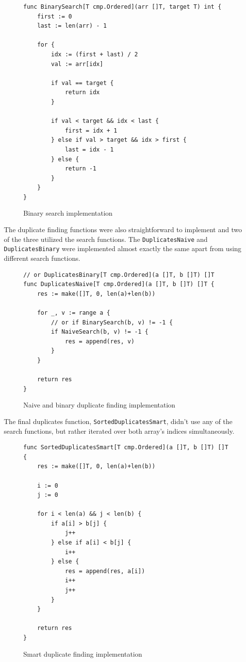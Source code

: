 \documentclass[a4paper,11pt]{article}
\begin{document}
    \begin{figure}[H]
        \centering
        \begin{verbatim}
func BinarySearch[T cmp.Ordered](arr []T, target T) int {
    first := 0
    last := len(arr) - 1

    for {
        idx := (first + last) / 2
        val := arr[idx]

        if val == target {
            return idx
        }

        if val < target && idx < last {
            first = idx + 1
        } else if val > target && idx > first {
            last = idx - 1
        } else {
            return -1
        }
    }
}
        \end{verbatim}
        \caption{Binary search implementation}
        \label{fig:binary-search}
    \end{figure}

    The duplicate finding functions were also straightforward to implement and two of the three utilized the search functions. The \texttt{DuplicatesNaive} and \texttt{DuplicatesBinary} were implemented almost exactly the same apart from using different search functions.

    \begin{figure}[H]
        \centering
        \begin{verbatim}
// or DuplicatesBinary[T cmp.Ordered](a []T, b []T) []T
func DuplicatesNaive[T cmp.Ordered](a []T, b []T) []T {
    res := make([]T, 0, len(a)+len(b))

    for _, v := range a {
        // or if BinarySearch(b, v) != -1 {
        if NaiveSearch(b, v) != -1 {
            res = append(res, v)
        }
    }

    return res
}
        \end{verbatim}
        \caption{Naive and binary duplicate finding implementation}
        \label{fig:duplicates}
    \end{figure}

    The final duplicates function, \texttt{SortedDuplicatesSmart}, didn't use any of the search functions, but rather iterated over both array's indices simultaneously.

    \begin{figure}[H]
        \centering
        \begin{verbatim}
func SortedDuplicatesSmart[T cmp.Ordered](a []T, b []T) []T {
    res := make([]T, 0, len(a)+len(b))

    i := 0
    j := 0

    for i < len(a) && j < len(b) {
        if a[i] > b[j] {
            j++
        } else if a[i] < b[j] {
            i++
        } else {
            res = append(res, a[i])
            i++
            j++
        }
    }

    return res
}
        \end{verbatim}
        \caption{Smart duplicate finding implementation}
        \label{fig:smart-duplicates}
    \end{figure}
\end{document}
